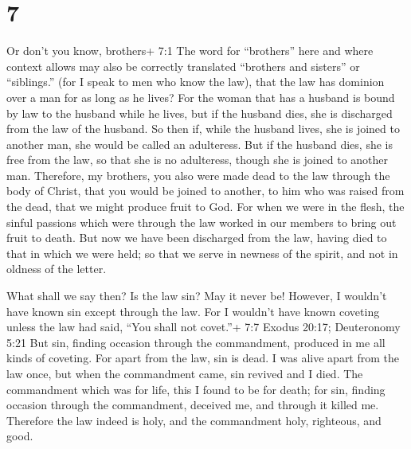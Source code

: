 \hypertarget{section-6}{%
\section{7}\label{section-6}}

 Or don't you know, brothers+ 7:1 The word for ``brothers''
here and where context allows may also be correctly translated
``brothers and sisters'' or ``siblings.'' (for I speak to men who know
the law), that the law has dominion over a man for as long as he lives?
 For the woman that has a husband is bound by law to the
husband while he lives, but if the husband dies, she is discharged from
the law of the husband.  So then if, while the husband
lives, she is joined to another man, she would be called an adulteress.
But if the husband dies, she is free from the law, so that she is no
adulteress, though she is joined to another man.  Therefore,
my brothers, you also were made dead to the law through the body of
Christ, that you would be joined to another, to him who was raised from
the dead, that we might produce fruit to God.  For when we
were in the flesh, the sinful passions which were through the law worked
in our members to bring out fruit to death.  But now we have
been discharged from the law, having died to that in which we were held;
so that we serve in newness of the spirit, and not in oldness of the
letter.

 What shall we say then? Is the law sin? May it never be!
However, I wouldn't have known sin except through the law. For I
wouldn't have known coveting unless the law had said, ``You shall not
covet.''+ 7:7 Exodus 20:17; Deuteronomy 5:21  But sin,
finding occasion through the commandment, produced in me all kinds of
coveting. For apart from the law, sin is dead.  I was alive
apart from the law once, but when the commandment came, sin revived and
I died.  The commandment which was for life, this I found
to be for death;  for sin, finding occasion through the
commandment, deceived me, and through it killed me. 
Therefore the law indeed is holy, and the commandment holy, righteous,
and good.

